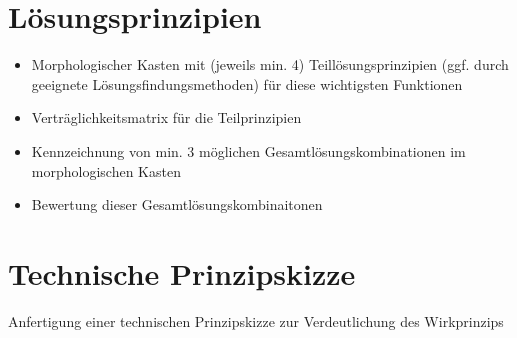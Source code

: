 \section{Lösungsprinzipien}
\begin{itemize}
\item Morphologischer Kasten mit (jeweils min. 4) Teillösungsprinzipien (ggf. durch geeignete Lösungsfindungsmethoden) für diese wichtigsten Funktionen
\item Verträglichkeitsmatrix für die Teilprinzipien
\item Kennzeichnung von min. 3 möglichen Gesamtlösungskombinationen im morphologischen Kasten
\item Bewertung dieser Gesamtlösungskombinaitonen
\end{itemize}

\section{Technische Prinzipskizze}
Anfertigung einer technischen Prinzipskizze zur Verdeutlichung des Wirkprinzips